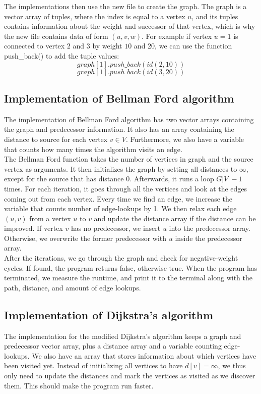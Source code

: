\documentclass[11pt]{article}
\begin{document}
\noindent The implementations then use the new file to create the graph. The graph is a vector array of tuples, where the index is equal to a vertex $u$, and its tuples contains information about the weight and successor of that vertex, which is why the new file contains data of form $(u,v,w)$. For example if vertex $u=1$ is connected to vertex $2$ and $3$ by weight $10$ and $20$, we can use the function push{\_}back() to add the tuple values:
$$graph[1].push{\_}back(id(2, 10))$$
$$graph[1].push{\_}back(id(3, 20))$$ 

\subsection{Implementation of Bellman Ford algorithm}
The implementation of Bellman Ford algorithm has two vector arrays containing the graph and predecessor information. It also has an array containing the distance to source for each vertex $v\in V$. Furthermore, we also have a variable that counts how many times the algorithm visits an edge.\\

\noindent The Bellman Ford function takes the number of vertices in graph and the source vertex as arguments. It then initializes the graph by setting all distances to $\infty$, except for the source that has distance $0$. Afterwards, it runs a loop $G|V| - 1$ times. For each iteration, it goes through all the vertices and look at the edges coming out from each vertex. Every time we find an edge, we increase the variable that counts number of edge-lookups by 1. We then relax each edge $(u,v)$ from a vertex $u$ to $v$ and update the distance array if the distance can be improved. If vertex $v$ has no predecessor, we insert $u$ into the predecessor array. Otherwise, we overwrite the former predecessor with $u$ inside the predecessor array.\\

\noindent After the iterations, we go through the graph and check for negative-weight cycles. If found, the program returns false, otherwise true. When the program has terminated, we measure the runtime, and print it to the terminal along with the path, distance, and amount of edge lookups.

\subsection{Implementation of Dijkstra's algorithm}
The implementation for the modified Dijkstra's algorithm keeps a graph and predecessor vector array, plus a distance array and a variable counting edge-lookups. We also have an array that stores information about which vertices have been visited yet. Instead of initializing all vertices to have $d[v]=\infty$, we thus only need to update the distances and mark the vertices as visited as we discover them. This should make the program run faster.\\
\end{document}
